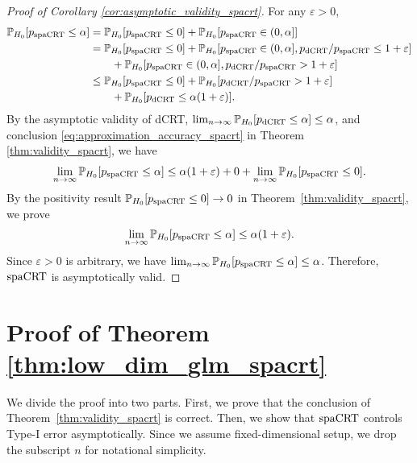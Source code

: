 \documentclass[12pt]{article}
\theoremstyle{definition}
\def\P{\mathbb{P}}
\def\P{\mathbb{P}}
\renewcommand{\P}{\mathbb{P}}							%
\newcommand{\dCRT}{\textnormal{dCRT}} 					%
\newcommand{\spacrt}{\textnormal{spaCRT}}               %
\begin{document}
  \begin{proof}[Proof of Corollary \ref{cor:asymptotic_validity_spacrt}]
    
    For any $\varepsilon>0$,
    \begin{align*}
      \P_{H_0}[p_{\spacrt}\leq \alpha]
      &
      =\P_{H_0}[p_{\spacrt}\leq 0]+\P_{H_0}[p_{\spacrt}\in (0,\alpha]]\\
      &
      =\P_{H_0}[p_{\spacrt}\leq 0]+\P_{H_0}[p_{\spacrt}\in (0,\alpha],p_{\dCRT}/p_{\spacrt}\leq 1+\varepsilon]\\
      &
      \qquad+\P_{H_0}[p_{\spacrt}\in (0,\alpha],p_{\dCRT}/p_{\spacrt}> 1+\varepsilon]\\
      &
      \leq \P_{H_0}[p_{\spacrt}\leq 0]+\P_{H_0}[p_{\dCRT}/p_{\spacrt}> 1+\varepsilon]\\
      &
      \qquad+\P_{H_0}[p_{\dCRT}\leq\alpha(1+\varepsilon)].
    \end{align*}
    By the asymptotic validity of dCRT, $\lim_{n\rightarrow\infty}\P_{H_0}[p_{\dCRT}\leq\alpha]\leq\alpha$, and conclusion \eqref{eq:approximation_accuracy_spacrt} in Theorem \ref{thm:validity_spacrt}, we have 
    \begin{align*}
      \lim_{n\rightarrow\infty}\P_{H_0}[p_{\spacrt}\leq\alpha]\leq \alpha(1+\varepsilon) + 0 + \lim_{n\rightarrow\infty}\P_{H_0}[p_{\spacrt}\leq 0].
    \end{align*}
    By the positivity result $\P_{H_0}[p_{\spacrt}\leq 0]\rightarrow 0$ in Theorem~\ref{thm:validity_spacrt}, we prove 
    \begin{align*}
      \lim_{n\rightarrow\infty}\P_{H_0}[p_{\spacrt}\leq\alpha]\leq \alpha(1+\varepsilon).
    \end{align*}
    Since $\varepsilon>0$ is arbitrary, we have $\lim_{n\rightarrow\infty}\P_{H_0}[p_{\spacrt}\leq \alpha]\leq \alpha$. Therefore, $\spacrt$ is asymptotically valid.
  \end{proof}

\section{Proof of Theorem \ref{thm:low_dim_glm_spacrt}}

We divide the proof into two parts. First, we prove that the conclusion of Theorem~\ref{thm:validity_spacrt} is correct. Then, we show that $\spacrt$ controls Type-I error asymptotically. Since we assume fixed-dimensional setup, we drop the subscript $n$ for notational simplicity.
\end{document}
